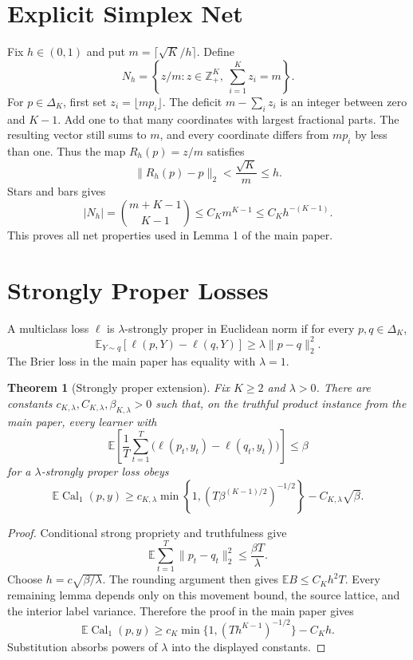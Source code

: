 \documentclass[twoside]{article}
\newtheorem{theorem}{Theorem}
\newcommand{\E}{\mathbb E}
\newcommand{\calone}{\operatorname{Cal}_1}
\newcommand{\simplex}{\Delta_K}
\newcommand{\1}{\mathbf 1}
\begin{document}
\runningauthor{}
\onecolumn


\section{Explicit Simplex Net}

Fix $h\in(0,1)$ and put $m=\lceil\sqrt K/h\rceil$. Define
\[
 N_h=\left\{z/m:z\in\mathbb Z_+^K,\ \sum_{i=1}^Kz_i=m\right\}.
\]
For $p\in\simplex$, first set $z_i=\lfloor mp_i\rfloor$. The deficit
$m-\sum_i z_i$ is an integer between zero and $K-1$. Add one to that many
coordinates with largest fractional parts. The resulting vector still sums to
$m$, and every coordinate differs from $mp_i$ by less than one. Thus the map
$R_h(p)=z/m$ satisfies
\[
 \|R_h(p)-p\|_2<\frac{\sqrt K}{m}\leq h.
\]
Stars and bars gives
\[
 |N_h|={m+K-1\choose K-1}\leq C_Km^{K-1}\leq C_Kh^{-(K-1)}.
\]
This proves all net properties used in Lemma 1 of the main paper.

\section{Strongly Proper Losses}

A multiclass loss $\ell$ is $\lambda$-strongly proper in Euclidean norm if
for every $p,q\in\simplex$,
\[
 \E_{Y\sim q}[\ell(p,Y)-\ell(q,Y)]
 \geq\lambda\|p-q\|_2^2.
\]
The Brier loss in the main paper has equality with $\lambda=1$.

\begin{theorem}[Strongly proper extension]\label{thm:strong}
Fix $K\geq2$ and $\lambda>0$. There are constants
$c_{K,\lambda},C_{K,\lambda},\beta_{K,\lambda}>0$ such that, on the truthful
product instance from the main paper, every learner with
\[
 \E\left[\frac1T\sum_{t=1}^T
 \bigl(\ell(p_t,y_t)-\ell(q_t,y_t)\bigr)\right]\leq\beta
\]
for a $\lambda$-strongly proper loss obeys
\[
 \E\calone(p,y)\geq
 c_{K,\lambda}\min\left\{1,
 (T\beta^{(K-1)/2})^{-1/2}\right\}
 -C_{K,\lambda}\sqrt\beta.
\]
\end{theorem}

\begin{proof}
Conditional strong propriety and truthfulness give
\[
 \E\sum_{t=1}^T\|p_t-q_t\|_2^2\leq\frac{\beta T}{\lambda}.
\]
Choose $h=c\sqrt{\beta/\lambda}$. The rounding argument then gives
$\E B\leq C_Kh^2T$. Every remaining lemma depends only on this movement
bound, the source lattice, and the interior label variance. Therefore the proof
in the main paper gives
\[
 \E\calone(p,y)\geq
 c_K\min\{1,(Th^{K-1})^{-1/2}\}-C_Kh.
\]
Substitution absorbs powers of $\lambda$ into the displayed constants.
\end{proof}
\end{document}
